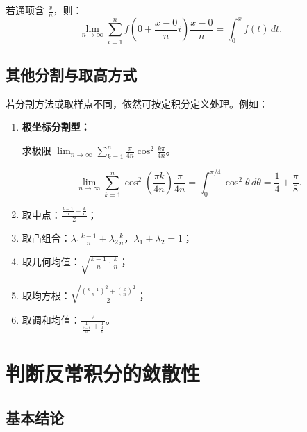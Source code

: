 若通项含 $\frac{x}{n}$，则：
\[
    \lim_{n \to \infty} \sum_{i=1}^{n} f\!\left(0+\frac{x-0}{n}i\right) \frac{x-0}{n}
    = \int_{0}^{x} f(t)\,dt.
\]

\subsection{其他分割与取高方式}

若分割方法或取样点不同，依然可按定积分定义处理。例如：

\begin{enumerate}
    \item \textbf{极坐标分割型：}
          \begin{example}
              求极限 $\lim_{n\to\infty}\sum_{k=1}^{n}\frac{\pi}{4n}\cos^{2}\frac{k\pi}{4n}$。
          \end{example}
          \begin{solution}
              \[
                  \lim_{n\to\infty}\sum_{k=1}^{n}\cos^{2}\!\left(\frac{\pi k}{4n}\right)\frac{\pi}{4n}
                  = \int_{0}^{\pi/4}\cos^{2}\theta\,d\theta
                  = \frac{1}{4}+\frac{\pi}{8}.
              \]
          \end{solution}

    \item 取中点：$\frac{\frac{k-1}{n}+\frac{k}{n}}{2}$；
    \item 取凸组合：$\lambda_1\frac{k-1}{n}+\lambda_2\frac{k}{n}$，$\lambda_1+\lambda_2=1$；
    \item 取几何均值：$\sqrt{\frac{k-1}{n}\cdot\frac{k}{n}}$；
    \item 取均方根：$\sqrt{\frac{(\frac{k-1}{n})^2+(\frac{k}{n})^2}{2}}$；
    \item 取调和均值：$\frac{2}{\frac{1}{\frac{k-1}{n}}+\frac{1}{\frac{k}{n}}}$。
\end{enumerate}

\section{判断反常积分的敛散性}

\subsection{基本结论}


